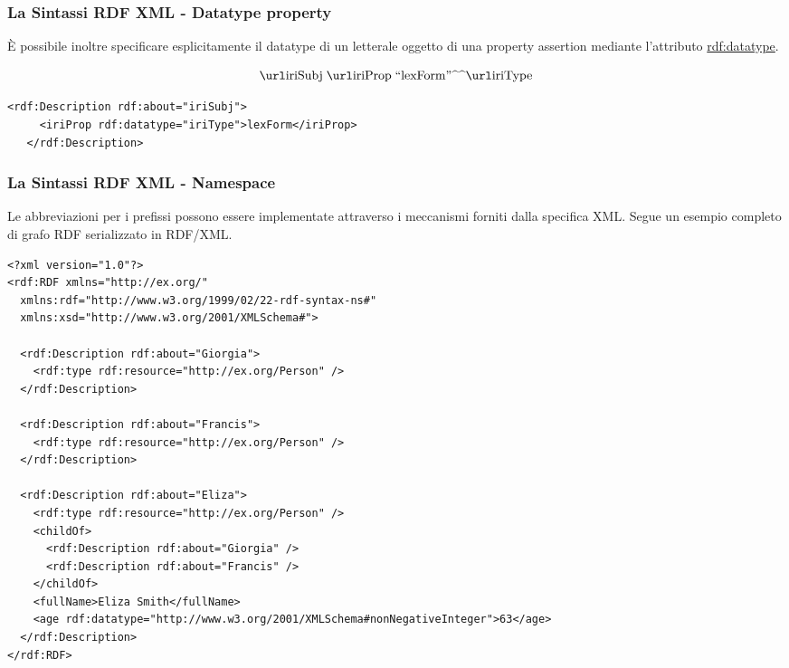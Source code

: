 \documentclass[8pt]{beamer}
\begin{document}
\begin{frame}[fragile]
 \frametitle{La Sintassi RDF XML - Datatype property}
\`E possibile inoltre specificare esplicitamente il datatype di un
letterale oggetto di una property assertion mediante l'attributo \url{rdf:datatype}.

\[
 \triple{iriSubj}{iriProp}{\literal{lexForm}{iriType}}
\]
\vspace{\baselineskip}

\begin{Verbatim}[fontsize=\small]
   <rdf:Description rdf:about="iriSubj">
     <iriProp rdf:datatype="iriType">lexForm</iriProp>
   </rdf:Description>
\end{Verbatim}
\end{frame}

\begin{frame}[fragile]
 \frametitle{La Sintassi RDF XML - Namespace}
Le abbreviazioni per i prefissi possono essere implementate attraverso
i meccanismi forniti dalla specifica XML. Segue un esempio completo
di grafo RDF serializzato in RDF/XML.
\vspace{\baselineskip}

\begin{Verbatim}[fontsize=\small]
<?xml version="1.0"?>
<rdf:RDF xmlns="http://ex.org/"
  xmlns:rdf="http://www.w3.org/1999/02/22-rdf-syntax-ns#"
  xmlns:xsd="http://www.w3.org/2001/XMLSchema#">

  <rdf:Description rdf:about="Giorgia">
    <rdf:type rdf:resource="http://ex.org/Person" />
  </rdf:Description>

  <rdf:Description rdf:about="Francis">
    <rdf:type rdf:resource="http://ex.org/Person" />
  </rdf:Description>
  
  <rdf:Description rdf:about="Eliza">
    <rdf:type rdf:resource="http://ex.org/Person" />
    <childOf>
      <rdf:Description rdf:about="Giorgia" />
      <rdf:Description rdf:about="Francis" />
    </childOf>    
    <fullName>Eliza Smith</fullName>
    <age rdf:datatype="http://www.w3.org/2001/XMLSchema#nonNegativeInteger">63</age>
  </rdf:Description>
</rdf:RDF>
\end{Verbatim}
\end{frame}
\end{document}
